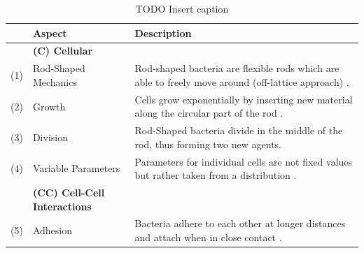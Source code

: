 \documentclass{article}
\begin{document}
\begin{table}[H]
    \centering
    \def\arraystretch{1.3}
    \begin{tabularx}{\textwidth}{c l X}
        &\textbf{Aspect} & \textbf{Description}\\
        \toprule
        &\textbf{(C) Cellular}\\
        \midrule
        (1) & Rod-Shaped Mechanics &
            Rod-shaped bacteria are flexible rods which are able to freely move around (off-lattice
            approach) \cite{Takeuchi2005,Ursell2014,Amir2014_2}.\\
        (2) & Growth &
            Cells grow exponentially by inserting new material along the circular part of the rod
            \cite{Robert2014,Takeuchi2005}.\\
        (3) & Division &
            Rod-Shaped bacteria divide in the middle of the rod, thus forming two new
            agents.\\
        (4) & Variable Parameters &
            Parameters for individual cells are not fixed values but rather taken from a
            distribution \cite{Koutsoumanis2013}.\\
        &\textbf{(CC) Cell-Cell Interactions}\\
        \midrule
        (5) & Adhesion &
            Bacteria adhere to each other at longer distances and attach when in close contact
            \cite{Verwey1947,Trejo2013}.\\
        \bottomrule
    \end{tabularx}
    \label{table:simulation-aspects}
    \caption{TODO Insert caption}
\end{table}
\end{document}

